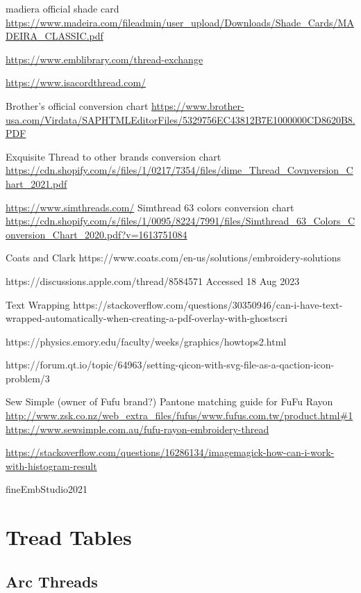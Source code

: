 \documentclass[a4paper]{report}
\begin{document}
madiera official shade card
\url{https://www.madeira.com/fileadmin/user_upload/Downloads/Shade_Cards/MADEIRA_CLASSIC.pdf}

\url{https://www.emblibrary.com/thread-exchange}

\url{https://www.isacordthread.com/}

Brother's official conversion chart
\url{https://www.brother-usa.com/Virdata/SAPHTMLEditorFiles/5329756EC43812B7E1000000CD8620B8.PDF}

Exquisite Thread to other brands conversion chart
\url{https://cdn.shopify.com/s/files/1/0217/7354/files/dime_Thread_Covnversion_Chart_2021.pdf}

\url{https://www.simthreads.com/}
Simthread 63 colors conversion chart
\url{https://cdn.shopify.com/s/files/1/0095/8224/7991/files/Simthread_63_Colors_Conversion_Chart_2020.pdf?v=1613751084}

Coats and Clark https://www.coats.com/en-us/solutions/embroidery-solutions

https://discussions.apple.com/thread/8584571 Accessed 18 Aug 2023

Text Wrapping
https://stackoverflow.com/questions/30350946/can-i-have-text-wrapped-automatically-when-creating-a-pdf-overlay-with-ghostscri

https://physics.emory.edu/faculty/weeks/graphics/howtops2.html

https://forum.qt.io/topic/64963/setting-qicon-with-svg-file-as-a-qaction-icon-problem/3

Sew Simple (owner of Fufu brand?) Pantone matching guide for FuFu Rayon
\url{http://www.zsk.co.nz/web_extra_files/fufus/www.fufus.com.tw/product.html#1}
\url{https://www.sewsimple.com.au/fufu-rayon-embroidery-thread}

\url{https://stackoverflow.com/questions/16286134/imagemagick-how-can-i-work-with-histogram-result}

fineEmbStudio2021




\appendix

\chapter{Tread Tables}

\section{Arc Threads}
\end{document}
